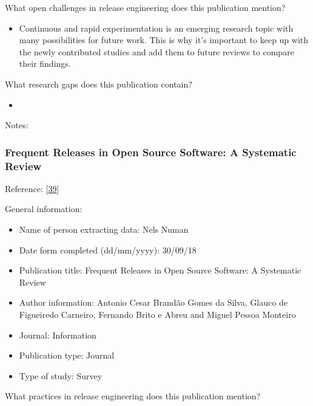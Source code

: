 \documentclass[]{book}
\providecommand{\tightlist}{%
  \setlength{\itemsep}{0pt}\setlength{\parskip}{0pt}}
\begin{document}
What open challenges in release engineering does this publication
mention?

\begin{itemize}
\tightlist
\item
  Continuous and rapid experimentation is an emerging research topic
  with many possibilities for future work. This is why it's important to
  keep up with the newly contributed studies and add them to future
  reviews to compare their findings.
\end{itemize}

What research gaps does this publication contain?

\begin{itemize}
\item
\end{itemize}

Notes:

\subsubsection{Frequent Releases in Open Source Software: A Systematic
Review}\label{frequent-releases-in-open-source-software-a-systematic-review}

Reference: {[}\protect\hyperlink{ref-cesar2017a}{39}{]}

General information:

\begin{itemize}
\tightlist
\item
  Name of person extracting data: Nels Numan
\item
  Date form completed (dd/mm/yyyy): 30/09/18
\item
  Publication title: Frequent Releases in Open Source Software: A
  Systematic Review
\item
  Author information: Antonio Cesar Brandão Gomes da Silva, Glauco de
  Figueiredo Carneiro, Fernando Brito e Abreu and Miguel Pessoa Monteiro
\item
  Journal: Information
\item
  Publication type: Journal
\item
  Type of study: Survey
\end{itemize}

What practices in release engineering does this publication mention?
\end{document}
